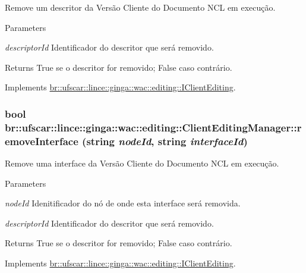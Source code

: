 Remove um descritor da Versão Cliente do Documento NCL em execução. 


\begin{DoxyParams}{Parameters}
\item[{\em descriptorId}]Identificador do descritor que será removido. \end{DoxyParams}
\begin{DoxyReturn}{Returns}
True se o descritor for removido; False caso contrário. 
\end{DoxyReturn}


Implements \hyperlink{classbr_1_1ufscar_1_1lince_1_1ginga_1_1wac_1_1editing_1_1IClientEditing_ad3ae20153844de461ded8a643443dc08}{br::ufscar::lince::ginga::wac::editing::IClientEditing}.

\hypertarget{classbr_1_1ufscar_1_1lince_1_1ginga_1_1wac_1_1editing_1_1ClientEditingManager_a23d60db841bf10edd6266de52613b9b2}{
\subsubsection[{removeInterface}]{\setlength{\rightskip}{0pt plus 5cm}bool br::ufscar::lince::ginga::wac::editing::ClientEditingManager::removeInterface (string {\em nodeId}, \/  string {\em interfaceId})}}
\label{classbr_1_1ufscar_1_1lince_1_1ginga_1_1wac_1_1editing_1_1ClientEditingManager_a23d60db841bf10edd6266de52613b9b2}


Remove uma interface da Versão Cliente do Documento NCL em execução. 


\begin{DoxyParams}{Parameters}
\item[{\em nodeId}]Idenitificador do nó de onde esta interface será removida. \item[{\em descriptorId}]Identificador do descritor que será removido. \end{DoxyParams}
\begin{DoxyReturn}{Returns}
True se o descritor for removido; False caso contrário. 
\end{DoxyReturn}


Implements \hyperlink{classbr_1_1ufscar_1_1lince_1_1ginga_1_1wac_1_1editing_1_1IClientEditing_abe89650753eccb62bf1772cc0e87d6b7}{br::ufscar::lince::ginga::wac::editing::IClientEditing}.

